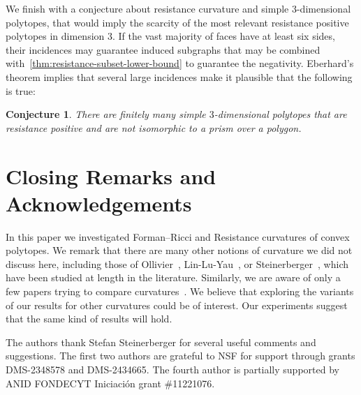 \documentclass[11pt,a4paper]{amsart}
\newtheorem{conjecture}[theorem]{Conjecture}
\begin{document}
We finish with a conjecture about resistance curvature and simple 3-dimensional polytopes, that would imply the scarcity of the most relevant resistance positive polytopes in dimension $3$. If the vast majority of faces have at least six sides, their incidences may guarantee induced subgraphs that may be combined with~\cref{thm:resistance-subset-lower-bound} to guarantee the negativity. Eberhard's theorem implies that several large incidences make it plausible that the following is true:


\begin{conjecture}
    There are finitely many simple $3$-dimensional polytopes that are resistance positive and are not isomorphic to a prism over a polygon. 
\end{conjecture}

\section*{Closing Remarks and Acknowledgements}

In this paper we investigated Forman--Ricci and Resistance curvatures of convex polytopes. We remark that there are many other notions of curvature we did not discuss here, including those of Ollivier~\cite{Ollivier2009}, Lin-Lu-Yau~\cite{lin2011ricci}, or Steinerberger~\cite{steinerberger2023curvature}, which have been studied at length in the literature. Similarly, we are aware of only a few papers trying to compare curvatures~\cite{Samal2018,WatanabeYamada2018,robertson2024discrete}. We believe that exploring the variants of our results for other curvatures could be of interest. Our experiments suggest that the same kind of results will hold. 

\vskip 12pt

The authors thank Stefan Steinerberger for several useful comments and suggestions. The first two authors are grateful to NSF for support through grants DMS-2348578 and DMS-2434665. The fourth author is partially supported by ANID FONDECYT Iniciaci\'on grant \#11221076.
\end{document}
